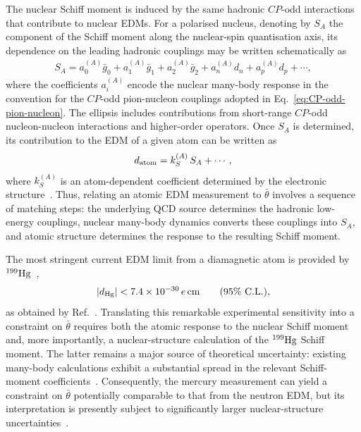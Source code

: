 \documentclass[review]{elsarticle}
\numberwithin{equation}{section}
\numberwithin{table}{section}
\numberwithin{figure}{section}
\begin{document}
The nuclear Schiff moment is induced by the same hadronic $CP$-odd interactions that contribute to nuclear EDMs. For a polarised nucleus, denoting by $S_A$ the component of the Schiff moment along the nuclear-spin quantisation axis, its dependence on the leading hadronic couplings may be written schematically as~\cite{Engel:2025uci}
\begin{align}
    S_A = a_0^{(A)}\bar g_0 + a_1^{(A)}\bar g_1 + a_2^{(A)}\bar g_2 + a_n^{(A)}d_n + a_p^{(A)}d_p +\cdots , 
    \label{eq:Schiff-hadronic-matching}
\end{align}
where the coefficients $a_i^{(A)}$ encode the nuclear many-body response in the convention for the $CP$-odd pion-nucleon couplings adopted in Eq.~\eqref{eq:CP-odd-pion-nucleon}. The ellipsis includes contributions from short-range $CP$-odd nucleon-nucleon interactions and higher-order operators. Once $S_A$ is determined, its contribution to the EDM of a given atom can be written as
\begin{align}
    d_{\rm atom} = k_S^{(A)}\,S_A +\cdots , 
    \label{eq:atomic-EDM-Schiff}
\end{align}
where $k_S^{(A)}$ is an atom-dependent coefficient determined by the electronic structure~\cite{Engel:2013lsa,Chupp:2017rkp}. Thus, relating an atomic EDM measurement to $\bar\theta$ involves a sequence of matching steps: the underlying QCD source determines the hadronic low-energy couplings, nuclear many-body dynamics converts these couplings into $S_A$, and atomic structure determines the response to the resulting Schiff moment.

The most stringent current EDM limit from a diamagnetic atom is provided by $^{199}{\rm Hg}$~\cite{Pospelov:2025vzj},
\begin{align}
    |d_{\rm Hg}| < 7.4\times10^{-30}\,e\,{\rm cm}
    \qquad
    (95\%~{\rm C.L.}),
    \label{eq:Hg-EDM-bound}
\end{align}
as obtained by Ref.~\cite{Graner:2016ses}. Translating this remarkable experimental sensitivity into a constraint on $\bar\theta$ requires both the atomic response to the nuclear Schiff moment and, more importantly, a nuclear-structure calculation of the $^{199}{\rm Hg}$ Schiff moment. The latter remains a major source of theoretical uncertainty: existing many-body calculations exhibit a substantial spread in the relevant Schiff-moment coefficients~\cite{Engel:2025uci,Pospelov:2025vzj}. Consequently, the mercury measurement can yield a constraint on $\bar\theta$ potentially comparable to that from the neutron EDM, but its interpretation is presently subject to significantly larger nuclear-structure uncertainties~\cite{Pospelov:2025vzj}.
\end{document}
